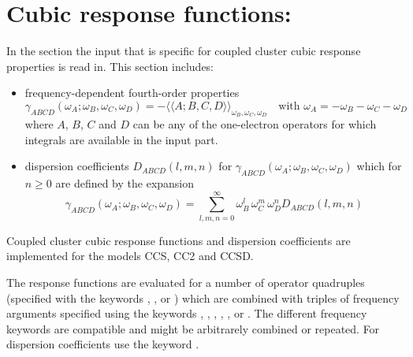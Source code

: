 
\section{Cubic response functions: }\label{sec:cccr}

In the  section the input that is  specific for 
coupled cluster cubic response properties is read in.
This section includes:
\begin{itemize}
\item frequency-dependent fourth-order properties
      $$ \gamma_{ABCD}(\omega_A;\omega_B,\omega_C,\omega_D) = -
           \langle\langle A;B,C,D\rangle\rangle_{\omega_B,\omega_C,\omega_D}
         \quad \mbox{with~} \omega_A = -\omega_B -\omega_C -\omega_D
      $$
      where $A$, $B$, $C$ and $D$ can be any of the one-electron
      operators for which integrals are available in the 
       input part.
\item dispersion coefficients $D_{ABCD}(l,m,n)$ for 
      $ \gamma_{ABCD}(\omega_A;\omega_B,\omega_C,\omega_D) $
      which for $n \ge 0$ are defined by the expansion 
      $$ \gamma_{ABCD}(\omega_A;\omega_B,\omega_C,\omega_D) = 
          \sum_{l,m,n=0}^{\infty} \omega_B^l \, \omega_C^m \, \omega_D^n
            D_{ABCD}(l,m,n) $$
\end{itemize}
Coupled cluster cubic response functions and dispersion coefficients
are implemented for the models CCS, CC2 and CCSD.

The response functions are evaluated for a number of operator quadruples
(specified with the keywords , , or )
which are combined with triples of frequency arguments specified
using the keywords , , , ,
, or . The different frequency keywords are 
compatible and might be arbitrarely combined or repeated.
For dispersion coefficients use the keyword .

